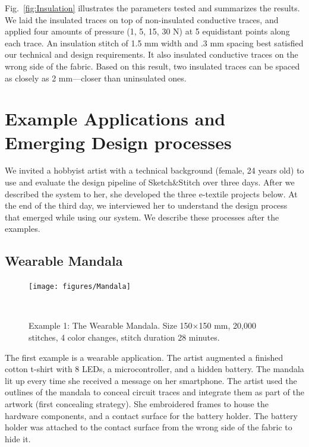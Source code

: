 \documentclass{sigchi}
\begin{document}
Fig.\ \ref{fig:Insulation} illustrates the parameters tested and summarizes the results.
We laid the insulated traces on top of non-insulated conductive traces, and applied four amounts of pressure (1, 5, 15, 30 N) at 5 equidistant points along each trace. An insulation stitch of 1.5 mm width and .3 mm spacing best satisfied our technical and design requirements. It also insulated conductive traces on the wrong side of the fabric. Based on this result, two insulated traces can be spaced as closely as 2 mm---closer than uninsulated ones.




\section{Example Applications and Emerging Design processes}
We invited a hobbyist artist with a technical background (female, 24 years old) to use and evaluate the design pipeline of Sketch\&Stitch over three days. After we described the system to her, she developed the three e-textile projects below. At the end of the third day, we interviewed her to understand the design process that emerged while using our system. We describe these processes after the examples.


\subsection{Wearable Mandala}
\begin{figure} [h!]
\centering
  \texttt{[image: figures/Mandala]} 
  \caption{Example 1: The Wearable Mandala. Size 150$\times$150 mm, 20,000 stitches, 4 color changes, stitch duration 28 minutes.}~\label{fig:Mandala}
  \vspace{-0.5em}
\end{figure}
The first example is a wearable application. The artist augmented a finished cotton t-shirt with 8 LEDs, a microcontroller, and a hidden battery. The mandala lit up every time she received a message on her smartphone. The artist used the outlines of the mandala to conceal circuit traces and integrate them as part of the artwork (first concealing strategy). She embroidered frames to house the hardware components, and a contact surface for the battery holder. The battery holder was attached to the contact surface from the wrong side of the fabric to hide it.
\end{document}
